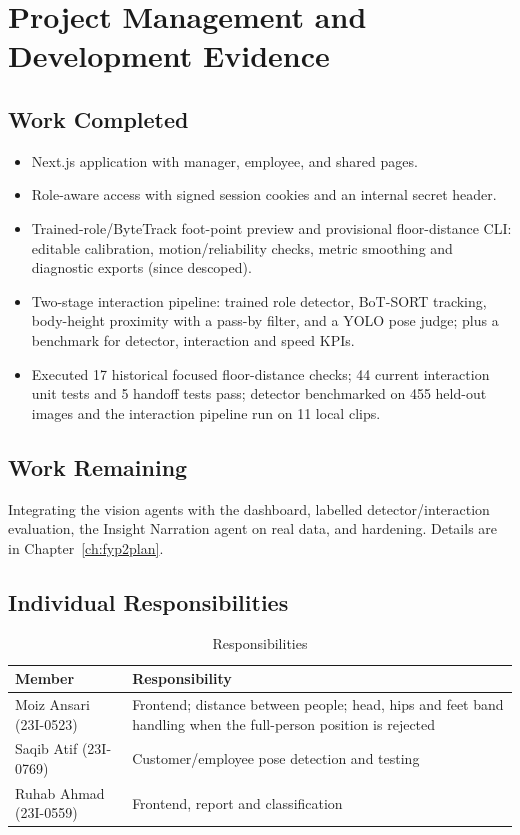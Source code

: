 \chapter{Project Management and Development Evidence}
\label{ch:mgmt}
\section{Work Completed}
\begin{itemize}
\item Next.js application with manager, employee, and shared pages.
\item Role-aware access with signed session cookies and an internal secret header.
\item Trained-role/ByteTrack foot-point preview and provisional floor-distance CLI: editable calibration, motion/reliability checks, metric smoothing and diagnostic exports (since descoped).
\item Two-stage interaction pipeline: trained role detector, BoT-SORT tracking, body-height proximity with a pass-by filter, and a YOLO pose judge; plus a benchmark for detector, interaction and speed KPIs.
\item Executed 17 historical focused floor-distance checks; 44 current interaction unit tests and 5 handoff tests pass; detector benchmarked on 455 held-out images and the interaction pipeline run on 11 local clips.
\end{itemize}

\section{Work Remaining}
Integrating the vision agents with the dashboard, labelled detector/interaction evaluation, the Insight Narration agent on real data, and hardening. Details are in Chapter~\ref{ch:fyp2plan}.

\section{Individual Responsibilities}
\begin{table}[H]
\centering
\caption{Responsibilities}\label{tab:responsibilities}
\begin{tabular}{P{0.25\textwidth}P{0.62\textwidth}}
\toprule
Member & Responsibility\\
\midrule
Moiz Ansari (23I-0523) & Frontend; distance between people; head, hips and feet band handling when the full-person position is rejected\\
Saqib Atif (23I-0769) & Customer/employee pose detection and testing\\
Ruhab Ahmad (23I-0559) & Frontend, report and classification\\
\bottomrule
\end{tabular}
\end{table}

